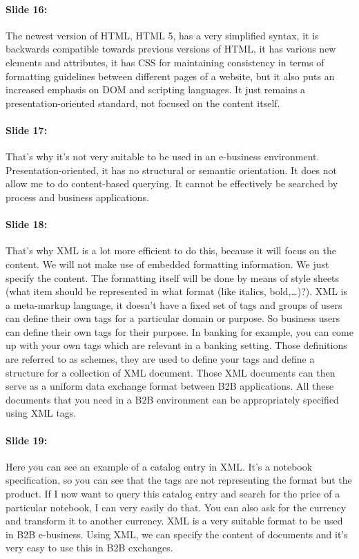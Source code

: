 \documentclass[10pt,a4paper]{report}
\begin{document}
\paragraph{Slide 16:}The newest version of HTML, HTML 5, has a very simplified syntax, it is backwards compatible towards previous versions of HTML, it has various new elements and attributes, it has CSS for maintaining consistency in terms of formatting guidelines between different pages of a website, but it also puts an increased emphasis on DOM and scripting languages. It just remains a presentation-oriented standard, not focused on the content itself.

\paragraph{Slide 17:}That's why it's not very suitable to be used in an e-business environment. Presentation-oriented, it has no structural or semantic orientation. It does not allow me to do content-based querying. It cannot be effectively be searched by process and business applications.

\paragraph{Slide 18:}That's why XML is a lot more efficient to do this, because it will focus on the content. We will not make use of embedded formatting information. We just specify the content. The formatting itself will be done by means of style sheets (what item should be represented in what format (like italics, bold,…)?).
XML is a meta-markup language, it doesn't have a fixed set of tags and groups of users can define their own tags for a particular domain or purpose. So business users can define their own tags for their purpose. In banking for example, you can come up with your own tags which are relevant in a banking setting. Those definitions are referred to as schemes, they are used to define your tags and define a structure for a collection of XML document. Those XML documents can then serve as a uniform data exchange format between B2B applications. All these documents that you need in a B2B environment can be appropriately specified using XML tags.

\paragraph{Slide 19:}Here you can see an example of a catalog entry in XML. It's a notebook specification, so you can see that the tags are not representing the format but the product. If I now want to query this catalog entry and search for the price of a particular notebook, I can very easily do that. You can also ask for the currency and transform it to another currency. XML is a very suitable format to be used in B2B e-business. Using XML, we can specify the content of documents and it's very easy to use this in B2B exchanges.
\end{document}
